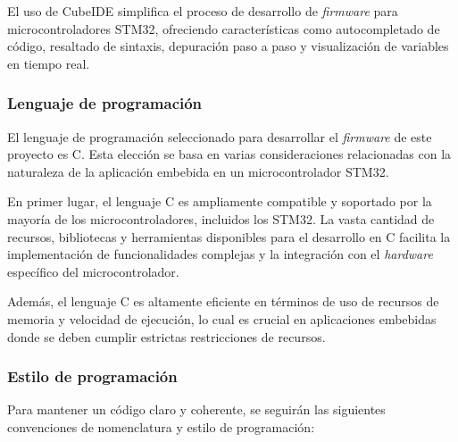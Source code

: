 El uso de CubeIDE simplifica el proceso de desarrollo de \textit{firmware} para microcontroladores STM32, ofreciendo características como autocompletado de código, resaltado de sintaxis, depuración paso a paso y visualización de variables en tiempo real.



\subsubsection{Lenguaje de programación}

El lenguaje de programación seleccionado para desarrollar el \textit{firmware} de este proyecto es C. Esta elección se basa en varias consideraciones relacionadas con la naturaleza de la aplicación embebida en un microcontrolador STM32.

En primer lugar, el lenguaje C es ampliamente compatible y soportado por la mayoría de los microcontroladores, incluidos los STM32. La vasta cantidad de recursos, bibliotecas y herramientas disponibles para el desarrollo en C facilita la implementación de funcionalidades complejas y la integración con el \textit{hardware} específico del microcontrolador.

Además, el lenguaje C es altamente eficiente en términos de uso de recursos de memoria y velocidad de ejecución, lo cual es crucial en aplicaciones embebidas donde se deben cumplir estrictas restricciones de recursos.

\subsubsection{Estilo de programación}

Para mantener un código claro y coherente, se seguirán las siguientes convenciones de nomenclatura y estilo de programación:


